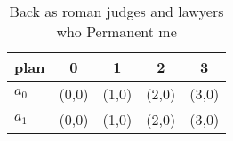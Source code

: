 \documentclass[a4paper]{article}
\begin{document}
\begin{table}
\begin{adjustbox}{width=0.7\columnwidth}
\begin{tabular}{|l|l|l|l|l|}
\hline
\textbf{plan} & \multicolumn{1}{c|}{\textbf{0}} & \multicolumn{1}{c|}{\textbf{1}} & \multicolumn{1}{c|}{\textbf{2}} & \multicolumn{1}{c|}{\textbf{3}} \\ \hline
\textbf{$a_0$}  & (0,0) & (1,0) & (2,0) & (3,0) \\ \hline
\textbf{$a_1$}  & (0,0) & (1,0) & (2,0) & (3,0) \\ \hline
\end{tabular}
\end{adjustbox}
\caption{Back as roman judges and lawyers who Permanent me
}
\end{table}
\end{document}
